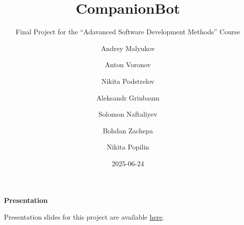 \documentclass[
  letterpaper,
  DIV=11,
  numbers=noendperiod]{scrartcl}
\title{CompanionBot}
\subtitle{Final Project for the ``Adavanced Software Development
Methods'' Course}
\author{Andrey Malyukov \and Anton Voronov \and Nikita
Podstrelov \and Aleksandr Grinbaum \and Solomon Naftaliyev \and Bohdan
Zachepa \and Nikita Popilin}
\date{2025-06-24}
\renewcommand*\contentsname{Table of contents}
\newcommand\contentsname{Table of contents}
\begin{document}
\maketitle

\renewcommand*\contentsname{Table of contents}
{
\hypersetup{linkcolor=}
\setcounter{tocdepth}{3}
\tableofcontents
}

\begin{tcolorbox}[enhanced jigsaw, colback=white, arc=.35mm, rightrule=.15mm, opacityback=0, leftrule=.75mm, toprule=.15mm, bottomrule=.15mm, left=2mm, breakable, colframe=quarto-callout-tip-color-frame]
\begin{minipage}[t]{5.5mm}
\textcolor{quarto-callout-tip-color}{\faLightbulb}
\end{minipage}%
\begin{minipage}[t]{\textwidth - 5.5mm}

\vspace{-3mm}\textbf{Presentation}\vspace{3mm}

Presentation slides for this project are available
\href{./companionbot-presentation.pdf}{here}.

\end{minipage}%
\end{tcolorbox}

\newpage{}
\end{document}
